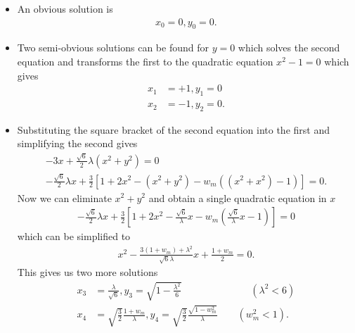 \documentclass[10pt,a4paper]{article}
\theoremstyle{definition}
\begin{document}
\begin{itemize}
\item An obvious solution is 
\begin{align}
    x_0=0, y_0=0.
\end{align}
\item Two semi-obvious solutions can be found for $y=0$ which solves the second equation and transforms the first to the quadratic equation $x^2-1=0$ which gives
\begin{align}
    x_1&=+1, y_1=0\\
    x_2&=-1, y_2=0.
\end{align}
\item Substituting the square bracket of the second equation into the first and simplifying the second gives
\begin{align}
    -3x+\frac{\sqrt{6}}{2}\lambda (x^2+y^2)=0\\
    -\frac{\sqrt{6}}{2}\lambda x+\frac{3}{2}[1+2x^2-(x^2+y^2)-w_m((x^2+x^2)-1)]=0.
\end{align}
Now we can eliminate $x^2+y^2$ and obtain a single quadratic equation in $x$
\begin{align}
    -\frac{\sqrt{6}}{2}\lambda x+\frac{3}{2}\left[1+2x^2-\frac{\sqrt{6}}{\lambda}x-w_m\left(\frac{\sqrt{6}}{\lambda}x-1\right)\right]=0
\end{align}
which can be simplified to
\begin{align}
    x^2-\frac{3(1+w_m)+\lambda^2}{\sqrt{6}\lambda}x+\frac{1+w_m}{2}=0.
\end{align}
This gives us two more solutions
\begin{align}
    x_3&=\frac{\lambda}{\sqrt{6}}, y_3=\sqrt{1-\frac{\lambda^2}{6}}\qquad\qquad\qquad\quad(\lambda^2<6)\\
    x_4&=\sqrt{\frac{3}{2}}\frac{1+w_m}{\lambda}, y_4=\sqrt{\frac{3}{2}}\frac{\sqrt{1-w_m^2}}{\lambda}\qquad(w_m^2<1).
\end{align}


\end{itemize}
\end{document}

